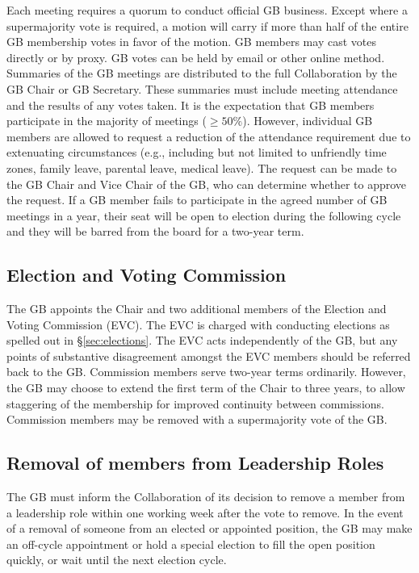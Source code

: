 \documentclass[12pt]{article}
\begin{document}
Each meeting requires a quorum to conduct official GB business. Except where a supermajority vote is required, a motion will carry if more than half of the entire GB membership votes in favor of the motion. GB members may cast votes directly or by proxy. GB votes can be held by email or other online method. Summaries of the GB meetings are distributed to the full Collaboration by the GB Chair or GB Secretary. These summaries must include meeting attendance and the results of any votes taken. It is the expectation that GB members participate in the majority of meetings ($\ge 50\%$). However, individual GB members are allowed to request a reduction of the attendance requirement due to extenuating circumstances (e.g., including but not limited to unfriendly time zones, family leave, parental leave, medical leave). The request can be made to the GB Chair and Vice Chair of the GB, who can determine whether to approve the request. If a GB member fails to participate in the agreed number of GB meetings in a year, their seat will be open to election during the following cycle and they will be barred from the board for a two-year term.  


\subsection{Election and Voting Commission}

The GB appoints the Chair and two additional members of the Election and Voting Commission (EVC).  The EVC is charged with conducting elections as spelled out in \S\ref{sec:elections}. The EVC acts independently of the GB, but any points of substantive disagreement amongst the EVC members should be referred back to the GB.  Commission members serve two-year terms ordinarily.  However, the GB may choose to extend the first term of the Chair to  three years, to allow staggering of the membership for improved continuity between commissions.   Commission members may be removed with a supermajority vote of the GB.
 
 \subsection{Removal of members from Leadership Roles}
 
The GB must inform the Collaboration of its decision to remove a member from a leadership role within one working week after the vote to remove.  In the event of a removal of someone from an elected or appointed position, the GB may make an off-cycle appointment or hold a special election to fill the open position quickly, or wait until the next election cycle.  
\end{document}
